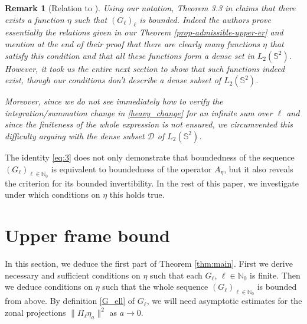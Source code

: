 \documentclass[a4paper,11pt,DIV=11,%
abstract=on%
]{scrartcl}
\newtheorem{cor}[thm]{Corollary}
\newtheorem{rem}[thm]{Remark}
\def\N{{\mathbb N}}
\newcommand{\red}[1]{#1}
\begin{document}
\begin{rem} [Relation to {\cite[Theorem 3.3]{AV99}}]
Using our notation, Theorem 3.3 in \cite{AV99} claims that there exists a function $\eta$ such that $(G_\ell)_\ell$ is bounded.
Indeed the authors prove essentially the relations given in 
\red{our} Theorem \ref{prop-admissible-upper-er}
and mention at the end of their proof
that there are clearly many functions $\eta$ that satisfy this condition and that all these functions form a dense set in
$L_2(\mathbb S^2)$. 
However, it took us the entire next section to show that such functions indeed exist, though our conditions \textit{don't} describe a dense subset of $L_2(\mathbb S^2)$.

Moreover, since we do not see immediately how to
verify the integration/summation change in \eqref{heavy_change} for an infinite sum over $\ell$ 
and since the finiteness of the whole expression is not ensured, 
we circumvented this difficulty arguing with the dense subset $\mathcal D$ of $L_2(\mathbb S^2)$. \end{rem}

The identity \eqref{eq:3} does not only demonstrate that boundedness of the sequence
$(G_\ell)_{\ell\in \N_0}$ is equivalent to boundedness of the operator $A_\eta$, 
but it also reveals the criterion for its bounded invertibility.
In the rest of this paper, we investigate under which conditions on $\eta$ this holds true.

\section{Upper frame bound} \label{asymptotics-for-zonal}
In this section, we deduce the first part of Theorem \ref{thm:main}.
First we  derive  necessary and sufficient conditions on $\eta$ 
such that each $G_\ell$, $\ell \in \mathbb N_0$ is finite.
Then we deduce conditions on $\eta$ such that the 
whole sequence $(G_\ell)_{\ell\in \N_0}$ is bounded from above.
By definition \eqref{G_ell} of $G_\ell$, we will need
asymptotic estimates for the zonal projections $\| \Pi_\ell \eta_a\|^2$ as $a \rightarrow 0$.
\end{document}

